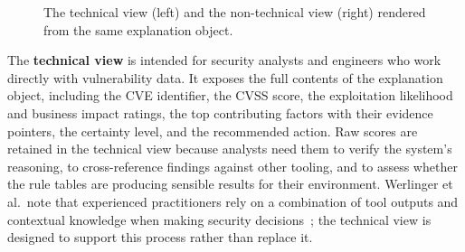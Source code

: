 \begin{figure}[h]
\centering
{}
\caption{The technical view (left) and the non-technical view (right) rendered from the same explanation object.}
\label{fig:stakeholder-views}
\end{figure}

The \textbf{technical view} is intended for security analysts and engineers who work directly with vulnerability data. It exposes the full contents of the explanation object, including the \ac{CVE} identifier, the \ac{CVSS} score, the exploitation likelihood and business impact ratings, the top contributing factors with their evidence pointers, the certainty level, and the recommended action. Raw scores are retained in the technical view because analysts need them to verify the system's reasoning, to cross-reference findings against other tooling, and to assess whether the rule tables are producing sensible results for their environment. Werlinger et al.\ note that experienced practitioners rely on a combination of tool outputs and contextual knowledge when making security decisions~\cite{werlinger2008ids}; the technical view is designed to support this process rather than replace it.

